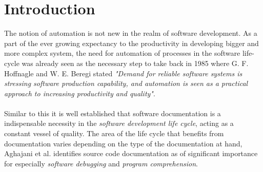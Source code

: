 \section{Introduction}
The notion of automation is not new in the realm of software development. As a part of the ever growing expectancy to the productivity in developing bigger and more complex system, the need for automation of processes in the software life-cycle was already seen as the necessary step to take back in 1985 where G. F. Hoffnagle and W. E. Beregi stated \textit{"Demand for reliable software systems is stressing software production capability, and automation is seen as a practical approach to increasing productivity and quality"}.
\\ \\
Similar to this it is well established that software documentation is a indispensable necessity in the \textit{software development life cycle}, acting as a constant vessel of quality. The area of the life cycle that benefits from documentation varies depending on the type of the documentation at hand, Aghajani et al.\cite{aghajani2020software} identifies source code documentation as of significant importance for especially \textit{software debugging} and \textit{program comprehension}.

